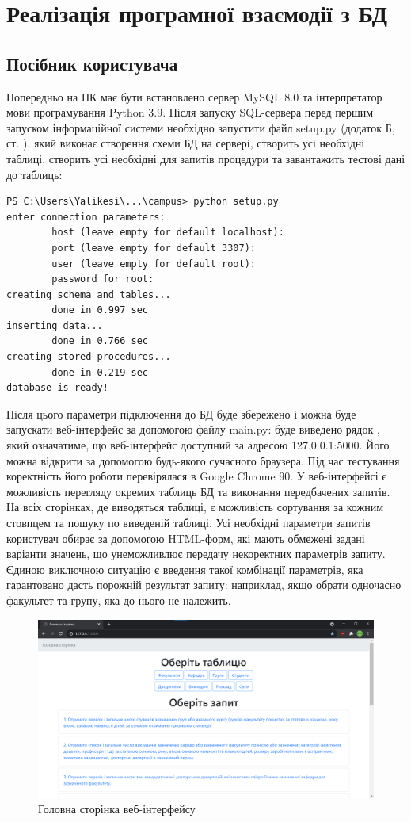 \newpage
\chapter{Реалізація програмної взаємодії з БД}
\section{Посібник користувача}
Попередньо на ПК має бути встановлено сервер MySQL 8.0 та інтерпретатор мови програмування Python 3.9.
Після запуску SQL-сервера перед першим запуском інформаційної системи необхідно
запустити файл setup.py (додаток Б, ст. \pageref{setup}), який виконає створення 
схеми БД на сервері, створить усі необхідні таблиці, створить усі необхідні для запитів процедури
та завантажить тестові дані до таблиць:
\begin{lstlisting}[style=code]
PS C:\Users\Yalikesi\...\campus> python setup.py
enter connection parameters:
        host (leave empty for default localhost):
        port (leave empty for default 3307):
        user (leave empty for default root):
        password for root:
creating schema and tables...
        done in 0.997 sec
inserting data...
        done in 0.766 sec
creating stored procedures...
        done in 0.219 sec
database is ready!
\end{lstlisting}
Після цього параметри підключення до БД буде збережено і можна буде запускати веб-інтерфейс за
допомогою файлу main.py: буде виведено рядок ,
який означатиме, що веб-інтерфейс доступний за адресою 127.0.0.1:5000. Його можна відкрити за допомогою
будь-якого сучасного браузера. Під час тестування коректність його роботи перевірялася в Google Chrome 90.
У веб-інтерфейсі є можливість перегляду окремих таблиць БД та виконання передбачених запитів.
На всіх сторінках, де виводяться таблиці, є можливість сортування за кожним стовпцем та пошуку по виведеній таблиці.
Усі необхідні параметри запитів користувач обирає за допомогою HTML-форм, які мають обмежені задані варіанти значень, що
унеможливлює передачу некоректних параметрів запиту. Єдиною виключною ситуацію є введення такої комбінації параметрів,
яка гарантовано дасть порожній результат запиту: наприклад, якщо обрати одночасно факультет та групу, яка до нього не належить. 
\begin{figure}[H]
    \centering
    \includegraphics[scale=0.38]{pics/web_main.png}
    \caption{Головна сторінка веб-інтерфейсу}
\end{figure}

